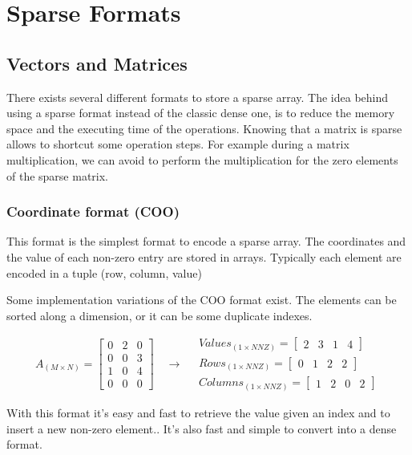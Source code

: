 \chapter{Sparse Formats}

\section{Vectors and Matrices}


There exists several different formats to store a sparse array. The idea behind using a sparse format instead of the classic dense one, is to reduce the memory space and the executing time of the operations. Knowing that a matrix is sparse allows to shortcut some operation steps. For example during a matrix multiplication, we can avoid to perform the multiplication for the zero elements of the sparse matrix.

\subsection{Coordinate format (COO)}

This format is the simplest format to encode a sparse array. The coordinates and the value of each non-zero entry are stored in arrays.
Typically each element are encoded in a tuple (row, column, value)

Some implementation variations of the COO format exist. The elements can be sorted along a dimension, or it can be some duplicate indexes.


\[
A_{(M\times N)} = 
\begin{bmatrix}
0 &  2 & 0 \\
0 &  0 & 3 \\
1 &  0 & 4\\
0 &  0 & 0
\end{bmatrix}
\quad\rightarrow\quad
\begin{aligned}
Values_{(1\times NNZ)} = 
\begin{bmatrix}
2 &  3 & 1 & 4
\end{bmatrix}
\\
Rows_{(1\times NNZ)} = 
\begin{bmatrix}
0 &  1 & 2 & 2
\end{bmatrix}
\\
Columns_{(1\times NNZ)} = 
\begin{bmatrix}
1 &  2 & 0 & 2
\end{bmatrix}
\end{aligned}
\]

With this format it's easy and fast to retrieve the value given an index and to insert a new non-zero element.. It's also fast and simple to convert into a dense format.

